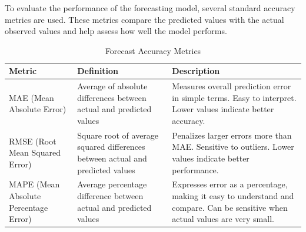 To evaluate the performance of the forecasting model, several standard accuracy metrics are used. These metrics compare the predicted values with the actual observed values and help assess how well the model performs.

\begin{table}[h]
\centering
\begin{tabular}{|p{4cm}|p{4cm}|p{6cm}|}
\hline
\textbf{Metric} & \textbf{Definition} & \textbf{Description} \\
\hline
MAE (Mean Absolute Error) & Average of absolute differences between actual and predicted values & Measures overall prediction error in simple terms. Easy to interpret. Lower values indicate better accuracy. \\
\hline
RMSE (Root Mean Squared Error) & Square root of average squared differences between actual and predicted values & Penalizes larger errors more than MAE. Sensitive to outliers. Lower values indicate better performance. \\
\hline
MAPE (Mean Absolute Percentage Error) & Average percentage difference between actual and predicted values & Expresses error as a percentage, making it easy to understand and compare. Can be sensitive when actual values are very small. \\
\hline
\end{tabular}
\caption{Forecast Accuracy Metrics}
\end{table}